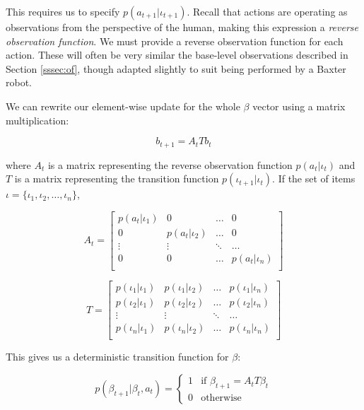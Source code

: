 \documentclass{article}
\begin{document}
This requires us to specify $p(a_{t+1} | \iota_{t+1})$. Recall that actions are operating as observations from the perspective of the human, making this expression a \emph{reverse observation function}. We must provide a reverse observation function for each action. These will often be very similar the base-level observations described in Section \ref{sssec:of}, though adapted slightly to suit being performed by a Baxter robot. 


We can rewrite our element-wise update for the whole $\beta$ vector using a matrix multiplication: 


$$b_{t+1} = A_{t}T b_{t}$$


where $A_{t}$ is a matrix representing the reverse observation function $p(a_{t} | \iota_t)$ and $T$ is a matrix representing the transition function $p(\iota_{t+1}|\iota_{t})$.  If the set of items $\mathcal{\iota} = \{ \iota_1, \iota_2, \ldots, \iota_n\}$, 

\begin{equation}
	A_{t} = \left[\begin{matrix} 
		p(a_{t} | \iota_1) & 0 & \ldots & 0 \\
		0 & p(a_{t} | \iota_2) & \ldots & 0 \\
		\vdots & \vdots & \ddots & \ldots  \\
		0 & 0 & \ldots  &  p(a_{t} | \iota_n) \\
	\end{matrix}
\right]
\end{equation}
		
\begin{equation}
	T = \left[\begin{matrix} 
			p(\iota_1 | \iota_1) & p(\iota_1| \iota_2)  & \ldots & p(\iota_1 | \iota_n) \\
			p(\iota_2 | \iota_1) & p(\iota_2 | \iota_2) & \ldots & p(\iota_2 | \iota_n) \\
			\vdots & \vdots & \ddots & \ldots  \\
			p(\iota_n | \iota_1) & p(\iota_n | \iota_2) & \ldots  &  p(\iota_n | \iota_n) \\
	\end{matrix}
\right]
\end{equation}

This gives us a deterministic transition function for $\beta$: 

\begin{equation}
	p(\beta_{t+1} | \beta_t, a_t) = \begin{cases}
		1 & \text{if } \beta_{t+1} = A_t T \beta_t \\
		0 & \text{otherwise}
	\end{cases}
\end{equation}
\end{document}
